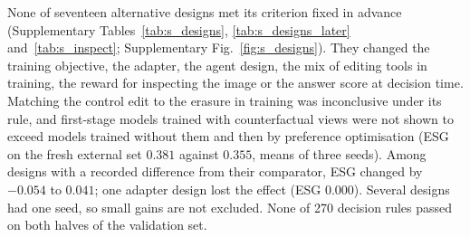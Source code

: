 None of seventeen alternative designs met its criterion fixed in advance (Supplementary Tables~\ref{tab:s_designs}, \ref{tab:s_designs_later} and~\ref{tab:s_inspect}; Supplementary Fig.~\ref{fig:s_designs}). They changed the training objective, the adapter, the agent design, the mix of editing tools in training, the reward for inspecting the image or the answer score at decision time. Matching the control edit to the erasure in training was inconclusive under its rule, and first-stage models trained with counterfactual views were not shown to exceed models trained without them and then by preference optimisation (ESG on the fresh external set $0.381$ against $0.355$, means of three seeds). Among designs with a recorded difference from their comparator, ESG changed by $-0.054$ to $0.041$; one adapter design lost the effect (ESG $0.000$). Several designs had one seed, so small gains are not excluded. None of 270 decision rules passed on both halves of the validation set.
